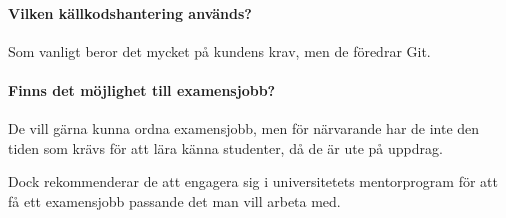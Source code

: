 \documentclass[../report.tex]{subfiles}
\begin{document}
    \paragraph{Vilken källkodshantering används?}
    Som vanligt beror det mycket på kundens krav, men de föredrar Git.
    
    \paragraph{Finns det möjlighet till examensjobb?}
    De vill gärna kunna ordna examensjobb, men för närvarande har de inte den tiden som krävs för att lära känna studenter, då de är ute på uppdrag.
    
    Dock rekommenderar de att engagera sig i universitetets mentorprogram för att få ett examensjobb passande det man vill arbeta med.
\end{document}
